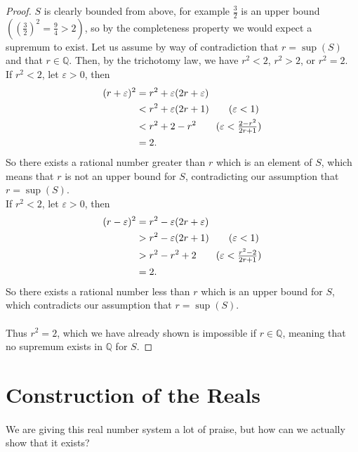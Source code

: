 \documentclass[../real_analysis.tex]{subfiles}
\begin{document}
        \begin{proof}
            $S$ is clearly bounded from above, for example $\frac{3}{2}$ is an upper bound $\left(\left(\frac{3}{2}\right)^2 = \frac{9}{4} > 2\right)$, so by the completeness property we would expect a supremum to exist. Let us assume by way of contradiction that $r=\sup(S)$ and that $r\in\mathbb{Q}$.
            Then, by the trichotomy law, we have $r^2<2$, $r^2>2$, or $r^2=2$.\\
            If $r^2<2$, let $\varepsilon>0$, then
            \begin{align*}
                (r+\varepsilon)^2 &= r^2+\varepsilon(2r+\varepsilon)\\
                &< r^2+\varepsilon(2r+1)\tag{$\varepsilon<1$}\\
                &< r^2+2-r^2\tag{$\varepsilon<\frac{2-r^2}{2r+1}$}\\
                &= 2.
            \end{align*}
            So there exists a rational number greater than $r$ which is an element of $S$, which means that $r$ is not an upper bound for $S$, contradicting our assumption that $r=\sup(S)$.\\
            If $r^2<2$, let $\varepsilon>0$, then
            \begin{align*}
                (r-\varepsilon)^2 &= r^2-\varepsilon(2r+\varepsilon)\\
                &> r^2-\varepsilon(2r+1)\tag{$\varepsilon<1$}\\
                &> r^2-r^2+2\tag{$\varepsilon<\frac{r^2-2}{2r+1}$}\\
                &= 2.
            \end{align*}
            So there exists a rational number less than $r$ which is an upper bound for $S$, which contradicts our assumption that $r=\sup(S)$.\\\\
            Thus $r^2=2$, which we have already shown is impossible if $r\in\mathbb{Q}$, meaning that no supremum exists in $\mathbb{Q}$ for $S$.
        \end{proof}

    \section{Construction of the Reals}
        \paragraph{}
        We are giving this real number system a lot of praise, but how can we actually show that it exists?
\end{document}
